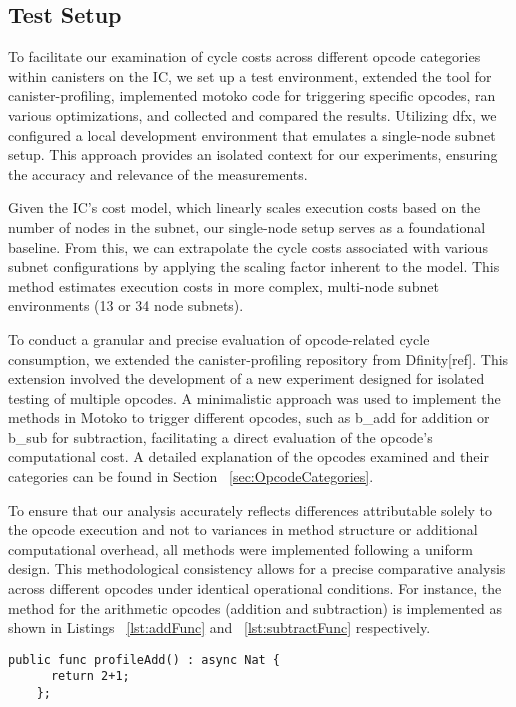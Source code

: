 \subsection{Test Setup}
\label{sec:TestSetup}

To facilitate our examination of cycle costs across different opcode categories within canisters on the IC, we set up a test environment, extended the tool for canister-profiling, implemented motoko code for triggering specific opcodes, ran various optimizations, and collected and compared the results. Utilizing dfx, we configured a local development environment that emulates a single-node subnet setup. This approach provides an isolated context for our experiments, ensuring the accuracy and relevance of the measurements.

Given the IC’s cost model, which linearly scales execution costs based on the number of nodes in the subnet, our single-node setup serves as a foundational baseline. From this, we can extrapolate the cycle costs associated with various subnet configurations by applying the scaling factor inherent to the model. This method estimates execution costs in more complex, multi-node subnet environments (13 or 34 node subnets).

To conduct a granular and precise evaluation of opcode-related cycle consumption, we extended the canister-profiling repository from Dfinity[ref]. This extension involved the development of a new experiment designed for isolated testing of multiple opcodes. A minimalistic approach was used to implement the methods in Motoko to trigger different opcodes, such as b\_add for addition or b\_sub for subtraction, facilitating a direct evaluation of the opcode’s computational cost. A detailed explanation of the opcodes examined and their categories can be found in Section ~\ref{sec:OpcodeCategories}.

To ensure that our analysis accurately reflects differences attributable solely to the opcode execution and not to variances in method structure or additional computational overhead, all methods were implemented following a uniform design. This methodological consistency allows for a precise comparative analysis across different opcodes under identical operational conditions.
For instance, the method for the arithmetic opcodes (addition and subtraction) is implemented as shown in Listings ~\ref{lst:addFunc} and ~\ref{lst:subtractFunc} respectively.

\begin{lstlisting}[caption={Function to add two numbers}, label={lst:addFunc}]
    public func profileAdd() : async Nat {
      return 2+1;
    };
  \end{lstlisting}
  
